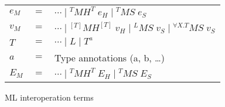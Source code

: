 \begin{figure}
\begin{center}
\begin{tabular}{lcl}
$e_{M}$ & $=$ & $\cdots\;\vert\;^{T}MH^{T}\;e_{H}\;\vert\;^{T}MS\;e_{S}$ \\
$v_{M}$ & $=$ & $\cdots\;\vert\;^{[T]}MH^{[T]}\;v_{H}\;\vert\;^{L}MS\;v_{S}\;\vert\;^{\forall X.T}MS\;v_{S}$ \\
$T$ & $=$ & $\cdots\;\vert\;L\;\vert\;T^{a}$ \\
$a$ & $=$ & Type annotations (a, b, \ldots) \\
$E_{M}$ & $=$ & $\cdots\;\vert\;^{T}MH^{T}\;E_{H}\;\vert\;^{T}MS\;E_{S}$
\end{tabular}
\end{center}
\caption{ML interoperation terms}
\label{fig:mit}
\end{figure}